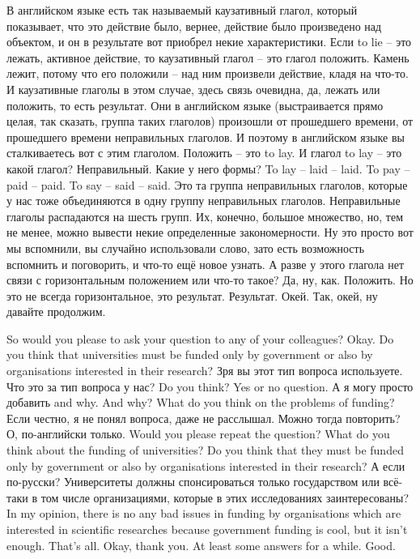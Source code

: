 \documentclass[main.tex]{subfiles}
\begin{document}
В английском языке есть так называемый каузативный глагол, который показывает, что это действие было, вернее, действие было произведено над объектом, и он в результате вот приобрел некие характеристики.
Если to lie -- это лежать, активное действие, то каузативный глагол -- это глагол положить.
Камень лежит, потому что его положили -- над ним произвели действие, кладя на что-то.
И каузативные глаголы в этом случае, здесь связь очевидна, да, лежать или положить, то есть результат.
Они в английском языке (выстраивается прямо целая, так сказать, группа таких глаголов) произошли от прошедшего времени, от прошедшего времени неправильных глаголов.
И поэтому в английском языке вы сталкиваетесь вот с этим глаголом.
Положить -- это to lay.
И глагол to lay -- это какой глагол?
Неправильный.
Какие у него формы?
To lay -- laid -- laid.
To pay -- paid -- paid.
To say -- said -- said.
Это та группа неправильных глаголов, которые у нас тоже объединяются в одну группу неправильных глаголов.
Неправильные глаголы распадаются на шесть групп.
Их, конечно, большое множество, но, тем не менее, можно вывести некие определенные закономерности.
Ну это просто вот мы вспомнили, вы случайно использовали слово, зато есть возможность вспомнить и поговорить, и что-то ещё новое узнать.
А разве у этого глагола нет связи с горизонтальным положением или что-то такое?
Да, ну, как.
Положить.
Но это не всегда горизонтальное, это результат.
Результат.
Окей.
Так, окей, ну давайте продолжим.

So would you please to ask your question to any of your colleagues?
Okay.
Do you think that universities must be funded only by government or also by organisations interested in their research?
Зря вы этот тип вопроса используете.
Что это за тип вопроса у нас?
Do you think?
Yes or no question.
А я могу просто добавить and why.
And why?
What do you think on the problems of funding?
Если честно, я не понял вопроса, даже не расслышал.
Можно тогда повторить?
О, по-английски только.
Would you please repeat the question?
What do you think about the funding of universities?
Do you think that they must be funded only by government or also by organisations interested in their research?
А если по-русски?
Университеты должны спонсироваться только государством  или всё-таки в том числе организациями, которые в этих исследованиях заинтересованы?
In my opinion, there is no any bad issues in funding by organisations which are interested in scientific researches because government funding is cool, but it isn't enough.
That's all.
Okay, thank you.
At least some answers for a while.
Good.
\end{document}
